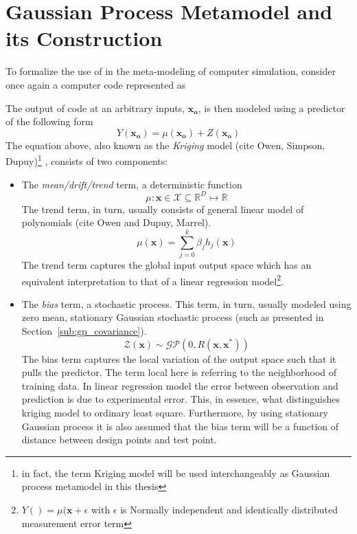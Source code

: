 \section{Gaussian Process Metamodel and its Construction}\label{sec:gp_metamodeling}

To formalize the use of in the meta-modeling of computer simulation, 
consider once again a computer code represented as 

The output of code at an arbitrary inputs, $\mathbf{x_o}$, is then modeled using a predictor of the following form
\begin{equation}
	Y (\mathbf{x_o}) = \mu (\mathbf{x_o}) + Z (\mathbf{x_o})
\label{eq:kriging_model}
\end{equation}
The equation above, also known as the \emph{Kriging} model (cite Owen, Simpson, Dupuy)\footnote{in fact, the term Kriging model will be used interchangeably as Gaussian process metamodel in this thesis} , consists of two components:
\begin{itemize}
	\item The \emph{mean/drift/trend} term, a deterministic function
	\begin{equation}
		\mu: \mathbf{x} \in \mathcal{X} \subseteq \mathbb{R}^D \mapsto \mathbb{R}
	\label{eq:trend_function_mapping}
	\end{equation}
	The trend term, in turn, usually consists of general linear model of polynomials (cite Owen and Dupuy, Marrel).
	\begin{equation}
		\mu(\mathbf{x}) = \sum_{j=0}^{k} \beta_j h_j(\mathbf{x})
	\label{eq:trend_function_definition}
	\end{equation}
	The trend term captures the global input output space which has an equivalent interpretation to that of a linear regression model\footnote{$Y() = \mu(\mathbf{x} + \epsilon$ with $\epsilon$ is Normally independent and identically distributed measurement error term}.
	\item The \emph{bias} term, a stochastic process. 
	This term, in turn, usually modeled using zero mean, stationary Gaussian stochastic process (such as presented in Section~\ref{sub:gp_covariance}).
	\begin{equation}
		\mathcal{Z}(\mathbf{x}) \sim \mathcal{GP}(0, R(\mathbf{x},\mathbf{x}^*))
	\label{eq:stationary_gp}
	\end{equation}
	The bias term captures the local variation of the output space such that it pulls the predictor.
	The term local here is referring to the neighborhood of training data.
	In linear regression model the error between observation and prediction is due to experimental error.
	This, in essence, what distinguishes kriging model to ordinary least square.
	Furthermore, by using stationary Gaussian process it is also assumed that the bias term will be a function of distance between design points and test point. 
\end{itemize}


